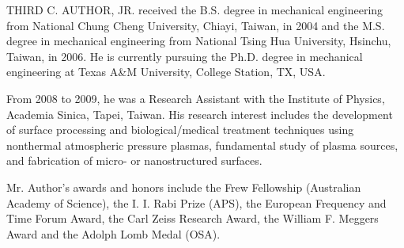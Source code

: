 \documentclass{IEEEojcsys}
\begin{document}
\begin{IEEEbiography}{THIRD C. AUTHOR, JR.}{\space} received the B.S. degree in mechanical engineering from National Chung Cheng University, Chiayi, Taiwan, in 2004 and the M.S. degree in mechanical engineering from National Tsing Hua University, Hsinchu, Taiwan, in 2006. He is currently pursuing the Ph.D. degree in mechanical engineering at Texas A\&M University, College Station, TX, USA.

    From 2008 to 2009, he was a Research Assistant with the Institute of Physics, Academia Sinica, Tapei, Taiwan. His research interest includes the development of surface processing and biological/medical treatment techniques using nonthermal atmospheric pressure plasmas, fundamental study of plasma sources, and fabrication of micro- or nanostructured surfaces. 

   Mr. Author's awards and honors include the Frew Fellowship (Australian Academy of Science), the I. I. Rabi Prize (APS), the European Frequency and Time Forum Award, the Carl Zeiss Research Award, the William F. Meggers Award and the Adolph Lomb Medal (OSA).
\end{IEEEbiography}
\end{document}
